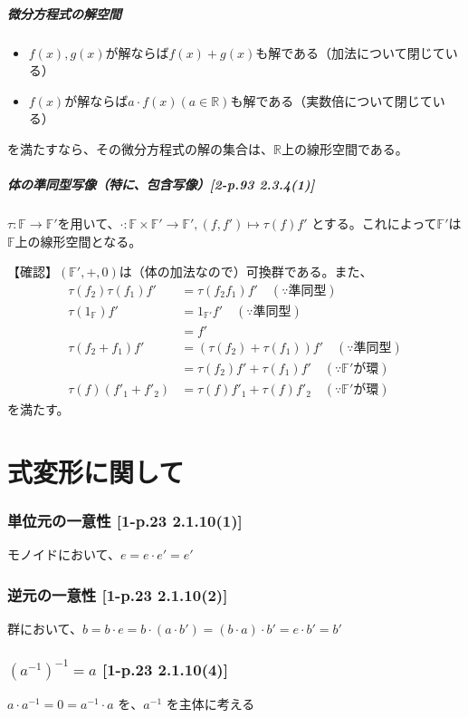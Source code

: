 \documentclass[twocolumn]{jsarticle}
\newcommand{\R}{\mathbb{R}}
\newcommand{\F}{\mathbb{F}}
\newcommand{\inv}[1]{#1^{-1}}
\begin{document}
\subsubsection{微分方程式の解空間}
\begin{itemize}
    \item \(f(x), g(x)\)が解ならば\(f(x)+g(x)\)も解である（加法について閉じている）
    \item \(f(x)\)が解ならば\(a\cdot f(x) (a\in \R)\)も解である（実数倍について閉じている）
\end{itemize}
を満たすなら、その微分方程式の解の集合は、\(\R\)上の線形空間である。
\subsubsection{体の準同型写像（特に、包含写像）[2-p.93 2.3.4(1)]}
\(\tau\colon\F\to\F'\)を用いて、\(\cdot\colon\F\times\F'\to\F', (f,f')\mapsto\tau(f)f'\) とする。これによって\(\F'\)は\(\F\)上の線形空間となる。

【確認】\((\F',+,0)\)は（体の加法なので）可換群である。また、
\begin{align*}
\tau(f_2)\tau(f_1)f'
&=\tau(f_2f_1)f' \quad(\because 準同型) \\
\tau(1_\F)f'
&=1_{\F'}f' \quad(\because 準同型) \\
&=f' \\
\tau(f_2+f_1)f'
&=(\tau(f_2)+\tau(f_1))f'\quad(\because 準同型) \\
&=\tau(f_2)f'+\tau(f_1)f'\quad(\because \F'が環) \\
\tau(f)(f'_1+f'_2)
&=\tau(f)f'_1+\tau(f)f'_2 \quad(\because \F'が環)
\end{align*}
を満たす。

\newpage

\part*{式変形に関して}
\setcounter{section}{0}
\section{単位元の一意性 [1-p.23 2.1.10(1)]}
モノイドにおいて、\(e = e \cdot e' = e'\)
\section{逆元の一意性 [1-p.23 2.1.10(2)]}
群において、\(b = b \cdot e = b \cdot (a \cdot b') = (b \cdot a) \cdot b' = e \cdot b' = b'\)
\section{\(\inv{(\inv{a})}=a\) [1-p.23 2.1.10(4)]}
\(a \cdot \inv{a} = 0 = \inv{a} \cdot a\) を、\(\inv{a}\) を主体に考える
\end{document}
